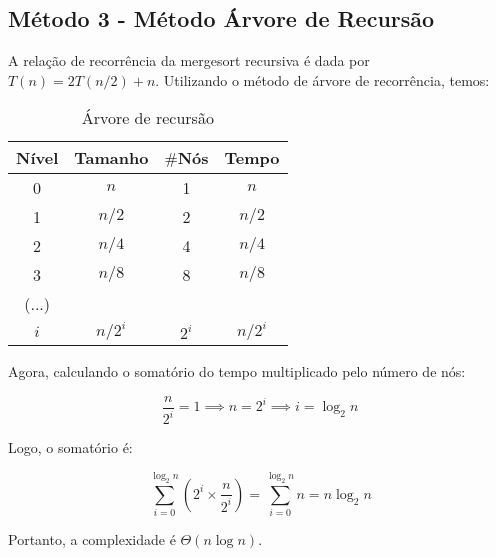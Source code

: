 \subsection{Método 3 - Método Árvore de Recursão}
A relação de recorrência da mergesort recursiva é dada por $T(n) = 2T(n/2) + n$. Utilizando o método de árvore de recorrência, temos:

\begin{table}[ht!]
    \centering
    \begin{tabular}{|c|c|c|c|}
    \hline
    \textbf{Nível} & \textbf{Tamanho} & $\#$\textbf{Nós} & \textbf{Tempo} \\ \hline
     0 & $n$ & 1 & $n$ \\ \hline
     1 & $n/2$ & 2 & $n/2$ \\ \hline
     2 & $n/4$ & 4 & $n/4$ \\ \hline
     3 & $n/8$ & 8 & $n/8$ \\ \hline
     (...) & & & \\ \hline
     $i$ & $n/2^i$ & $2^i$ & $n/2^i$ \\ \hline 
    \end{tabular}  
    \caption{Árvore de recursão}
\end{table}

Agora, calculando o somatório do tempo multiplicado pelo número de nós:

\[
\frac{n}{2^i} = 1 \implies n = 2^i \implies i = \log_2{n}
\]

Logo, o somatório é:

\[
\sum_{i=0}^{\log_2{n}} \left( 2^i \times \frac{n}{2^i} \right) = \sum_{i=0}^{\log_2{n}} n = n \log_2{n}
\]

Portanto, a complexidade é $\Theta(n \log n)$.
